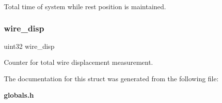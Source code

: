 Total time of system while rest position is maintained. \mbox{\label{structst__counters_a0286ab74bf93202e73bd343c1d340e42}} 
\subsubsection{wire\+\_\+disp}
{\footnotesize\ttfamily uint32 wire\+\_\+disp}

Counter for total wire displacement measurement. 

The documentation for this struct was generated from the following file\+:\begin{DoxyCompactItemize}
\item 
\textbf{ globals.\+h}\end{DoxyCompactItemize}
